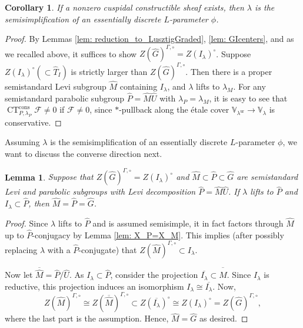 \documentclass{amsart}
\newtheorem{lemma}[theorem]{Lemma}
\newtheorem{corollary}[theorem]{Corollary}
\theoremstyle{definition}
\theoremstyle{remark}
\numberwithin{equation}{section}
\newcommand{\ov}{\overline}
\newcommand{\mc}{\mathcal}
\newcommand{\wh}{\widehat}
\DeclareMathOperator{\CT}{\mathrm{CT}}
\newcommand{\ur}{\mathrm{ur}}
\newcommand{\V}{\mathbb{V}}
\begin{document}
\begin{corollary}
If a nonzero cuspidal constructible sheaf exists, then $\lambda$ is the semisimplification of an essentially discrete $L$-parameter $\phi$.
\end{corollary}

\begin{proof}
By Lemmas \ref{lem: reduction_to_LusztigGraded}, \ref{lem: GIcenters}, and \cite{LusztigGraded} as we recalled above, it suffices to show $Z(\wh{G})^{\Gamma, \circ} = Z(I_{\lambda})^{\circ}$. Suppose $Z(I_{\lambda})^{\circ}(\subset \wh T_I)$ is strictly larger than $Z(\wh{G})^{\Gamma, \circ}$. Then there is a proper semistandard Levi subgroup $\wh M$ containing $I_\lambda$, and $\lambda$ lifts to $\lambda_M$. For any semistandard parabolic subgroup $\wh P=\wh M \wh U$ with $\lambda_P=\lambda_M$, it is easy to see that $\CT_{P,\lambda_P}^{\mathrm{cons}} \mc F\neq 0$ if $\mc F\neq 0$, since $*$-pullback along the \'etale cover $\V_{\lambda^\ur}\to \V_\lambda$ is conservative. 
\end{proof}

Assuming $\lambda$ is the semisimplification of an essentially discrete $L$-parameter $\phi$, we want to discuss the converse direction next. 

\begin{lemma}{\label{lem: lambdaIparabolic}}
Suppose that $Z(\wh{G})^{\Gamma, \circ}= Z(I_{\lambda})^{\circ}$ and $\wh M\subset \wh P \subset \wh{G}$ are semistandard Levi and parabolic subgroups with Levi decomposition $\wh P=\wh M \wh U$. If $\lambda$ lifts to $\wh P$ and $I_{\lambda} \subset \wh P$, then $\wh M =\wh P= \wh{G}$. 
\end{lemma}

\begin{proof}
Since $\lambda$ lifts to $\wh{P}$ and is assumed semisimple, it in fact factors through $\wh{M}$ up to $\wh{P}$-conjugacy by Lemma \ref{lem: X_P=X_M}. This implies (after possibly replacing $\lambda$ with a $\wh P$-conjugate) that $Z(\wh{M})^{\Gamma, \circ} \subset I_{\lambda}$. 

Now let $\ov{\wh M} = \wh P/\wh U$. As $I_{\lambda} \subset \wh P$, consider the projection $\ov{I_{\lambda}} \subset \ov{\wh M}$. Since $I_{\lambda}$ is reductive, this projection induces an isomorphism $I_{\lambda} \cong \ov{I_{\lambda}}$. Now, 
\[
Z(\wh M)^{\Gamma, \circ} \cong Z(\ov{\wh M})^{\Gamma, \circ} \subset Z(\ov{I_{\lambda}})^{\circ} \cong Z(I_{\lambda})^{\circ} = Z(\wh{G})^{\Gamma, \circ},
\]
where the last part is the assumption. Hence, $\wh M= \wh{G}$ as desired. 
\end{proof}
\end{document}
